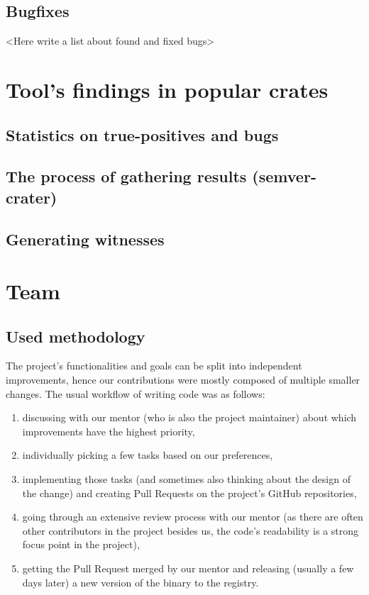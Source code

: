 \documentclass[licencjacka,en]{pracamgr}
\begin{document}
\section{Bugfixes}\label{r:section_bugfixes}

<Here write a list about found and fixed bugs>


\chapter{Tool's findings in popular crates}\label{r:chapter_results_popular_crates}

\section{Statistics on true-positives and bugs}\label{r:section_results_statistics}

\section{The process of gathering results (semver-crater)}\label{r:section_results_semver_crater}

\section{Generating witnesses}\label{r:section_generating_witnesses}


\chapter{Team}\label{r:chapter_team}

\section{Used methodology}\label{r:section_used_methodology}

The project's functionalities and goals can be split into independent improvements, hence our
contributions were mostly composed of multiple smaller changes. The usual workflow of writing
code was as follows:
\begin{enumerate}
	\item discussing with our mentor (who is also the project maintainer) about which improvements
		have the highest priority,
	\item individually picking a few tasks based on our preferences,
	\item implementing those tasks (and sometimes also thinking about the design of the change)
		and creating Pull Requests on the project's GitHub repositories,
	\item going through an extensive review process with our mentor (as there are often other
		contributors in the project besides us, the code's readability is a strong focus point
		in the project),
	\item getting the Pull Request merged by our mentor and releasing (usually a few days later)
		a new version of the binary to the registry.
\end{enumerate}
\end{document}
